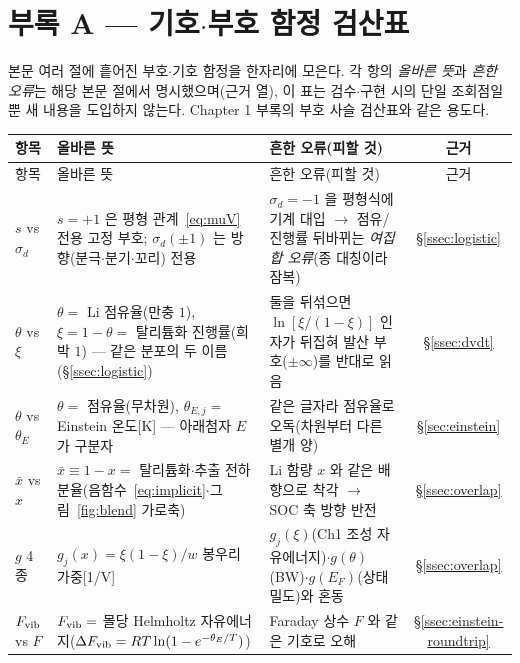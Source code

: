 \section*{부록 A --- 기호$\cdot$부호 함정 검산표}

본문 여러 절에 흩어진 부호$\cdot$기호 함정을 한자리에 모은다. 각 항의 \emph{올바른 뜻}과 \emph{흔한 오류}는
해당 본문 절에서 명시했으며(근거 열), 이 표는 검수$\cdot$구현 시의 단일 조회점일 뿐 새 내용을 도입하지 않는다.
Chapter 1 부록의 부호 사슬 검산표와 같은 용도다.

\begin{longtable}{p{} p{} p{} c}
\toprule
항목 & 올바른 뜻 & 흔한 오류(피할 것) & 근거 \\
\midrule
\endfirsthead
\toprule
항목 & 올바른 뜻 & 흔한 오류(피할 것) & 근거 \\
\midrule
\endhead
$s$ vs $\sigma_d$ &
$s{=}+1$ 은 평형 관계~\eqref{eq:muV} 전용 고정 부호; $\sigma_d(\pm1)$ 는 방향(분극$\cdot$분기$\cdot$꼬리) 전용 &
$\sigma_d{=}-1$ 을 평형식에 기계 대입 $\to$ 점유/진행률 뒤바뀌는 \emph{여집합 오류}(종 대칭이라 잠복) &
\S\ref{ssec:logistic} \\
$\theta$ vs $\xi$ &
$\theta=$ Li 점유율(만충 $1$), $\xi=1-\theta=$ 탈리튬화 진행률(희박 $1$) --- 같은 분포의 두 이름
(\S\ref{ssec:logistic}) &
둘을 뒤섞으면 $\ln[\xi/(1-\xi)]$ 인자가 뒤집혀 발산 부호($\pm\infty$)를 반대로 읽음 &
\S\ref{ssec:dvdt} \\
$\theta$ vs $\theta_E$ &
$\theta=$ 점유율(무차원), $\theta_{E,j}=$ Einstein 온도[K] --- 아래첨자 $E$ 가 구분자 &
같은 글자라 점유율로 오독(차원부터 다른 별개 양) &
\S\ref{sec:einstein} \\
$\bar x$ vs $x$ &
$\bar x\equiv1-x=$ 탈리튬화$\cdot$추출 전하 분율(음함수~\eqref{eq:implicit}$\cdot$그림~\ref{fig:blend} 가로축) &
Li 함량 $x$ 와 같은 배향으로 착각 $\to$ SOC 축 방향 반전 &
\S\ref{ssec:overlap} \\
$g$ 4종 &
$g_j(x){=}\xi(1-\xi)/w$ 봉우리 가중[1/V] &
$g_j(\xi)$(Ch1 조성 자유에너지)$\cdot$$g(\theta)$(BW)$\cdot$$g(E_F)$(상태밀도)와 혼동 &
\S\ref{ssec:overlap} \\
$F_{\mathrm{vib}}$ vs $F$ &
$F_{\mathrm{vib}}=$ 몰당 Helmholtz 자유에너지($\Delta F_{\mathrm{vib}}=RT\ln(1-e^{-\theta_E/T})$) &
Faraday 상수 $F$ 와 같은 기호로 오해 &
\S\ref{ssec:einstein-roundtrip} \\

\end{longtable}
